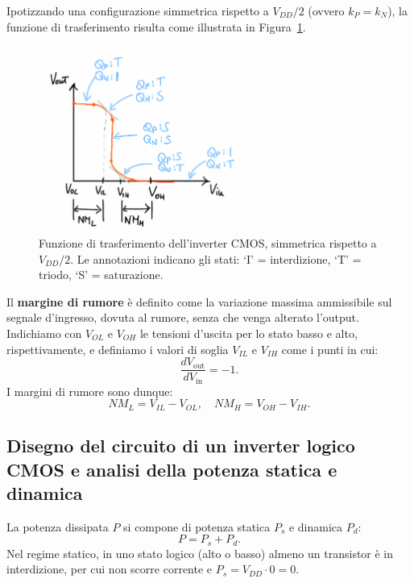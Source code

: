 Ipotizzando una configurazione simmetrica rispetto a \(V_{DD}/2\) (ovvero \(k_P=k_N\)), la funzione di trasferimento risulta come illustrata in Figura~\ref{fig:funzione_trasferimento}.\\[2mm]
\begin{figure}[H]
    \centering
    \includegraphics[width=0.6\textwidth]{images/2.1.1.2.png}
    \caption{Funzione di trasferimento dell'inverter CMOS, simmetrica rispetto a \(V_{DD}/2\). Le annotazioni indicano gli stati: ‘I’ = interdizione, ‘T’ = triodo, ‘S’ = saturazione.}
    \label{fig:funzione_trasferimento}
\end{figure}

Il \textbf{margine di rumore} è definito come la variazione massima ammissibile sul segnale d’ingresso, dovuta al rumore, senza che venga alterato l’output. Indichiamo con \(V_{OL}\) e \(V_{OH}\) le tensioni d’uscita per lo stato basso e alto, rispettivamente, e definiamo i valori di soglia \(V_{IL}\) e \(V_{IH}\) come i punti in cui:
\[
\frac{dV_{\text{out}}}{dV_{\text{in}}} = -1.
\]
I margini di rumore sono dunque:
\[
NM_L = V_{IL} - V_{OL}, \quad NM_H = V_{OH} - V_{IH}.
\]

\newpage
\subsection{Disegno del circuito di un inverter logico CMOS e analisi della potenza statica e dinamica}

La potenza dissipata \(P\) si compone di potenza statica \(P_s\) e dinamica \(P_d\):
\[
P = P_s + P_d.
\]
Nel regime statico, in uno stato logico (alto o basso) almeno un transistor è in interdizione, per cui non scorre corrente e \(P_s = V_{DD}\cdot0 = 0\).

